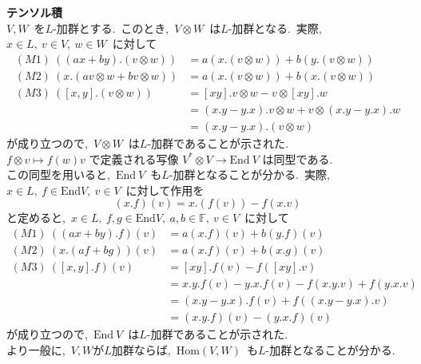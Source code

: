 \documentclass[uplatex,dvipdfmx]{jsarticle}
\begin{document}
\textbf{テンソル積}\\
$V,W$~を$L$-加群とする.~このとき,~$V \otimes W$~は$L$-加群となる.~実際,~$x\in L,~v\in V,~w\in W$~に対して
\begin{equation*}
    \begin{split}
        (M1)~((ax+by).(v\otimes w)) &= a(x.(v\otimes w)) + b(y.(v\otimes w))\\
        (M2)~(x.(av\otimes w + bv\otimes w)) &= a(x.(v\otimes w)) + b(x.(v\otimes w))\\
        (M3)~([x,y].(v\otimes w)) &= [xy].v\otimes w - v\otimes [xy].w\\
        &= (x.y -y.x).v \otimes w + v\otimes (x.y - y.x).w \\
        &= (x.y - y.x).(v\otimes w)
    \end{split}
\end{equation*}
が成り立つので,~$V\otimes W$~は$L$-加群であることが示された.\\
$f\otimes v \mapsto f(w)v$ で定義される写像 $V^* \otimes V \to \text{End}~V$ は同型である.\\
この同型を用いると,~$\text{End}~V$~も$L$-加群となることが分かる.~実際,~$x\in L,~f\in \text{End} V,~v\in V$~に対して作用を
\begin{equation*}
    (x.f)(v) = x.(f(v)) - f(x.v)
\end{equation*}
と定めると,~$x\in L,~f,g\in \text{End} V,~a,b\in \mathbb{F},~v\in V$~に対して
\begin{equation*}
    \begin{split}
        (M1)~((ax+by).f)(v) &= a(x.f)(v) + b(y.f)(v)\\
        (M2)~(x.(af+bg))(v) &= a(x.f)(v) + b(x.g)(v)\\
        (M3)~([x,y].f)(v) &= [xy].f(v) - f([xy].v)\\
        &= x.y.f(v) - y.x.f(v) - f(x.y.v) + f(y.x.v)\\
        &= (x.y - y.x).f(v) + f((x.y - y.x).v)\\
        &= (x.y.f)(v) - (y.x.f)(v)
    \end{split}
\end{equation*}
が成り立つので,~$\text{End}~V$~は$L$-加群であることが示された.\\
より一般に,~$V,W$が$L$加群ならば,~$\text{Hom}(V,W)$~も$L$-加群となることが分かる.
\newpage
\end{document}
